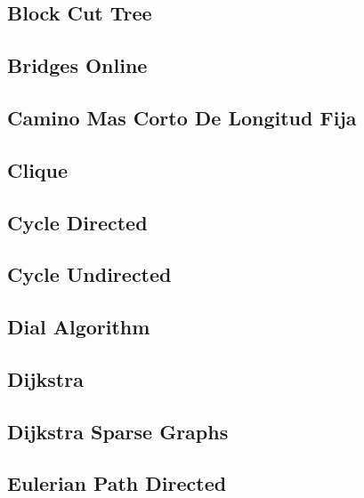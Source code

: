 \subsection{Block Cut Tree}
\raggedbottom
\hrulefill
\subsection{Bridges Online}
\raggedbottom
\hrulefill
\subsection{Camino Mas Corto De Longitud Fija}
\raggedbottom
\hrulefill
\subsection{Clique}
\raggedbottom
\hrulefill
\subsection{Cycle Directed}
\raggedbottom
\hrulefill
\subsection{Cycle Undirected}
\raggedbottom
\hrulefill
\subsection{Dial Algorithm}
\raggedbottom
\hrulefill
\subsection{Dijkstra}
\raggedbottom
\hrulefill
\subsection{Dijkstra Sparse Graphs}
\raggedbottom
\hrulefill
\subsection{Eulerian Path Directed}
\raggedbottom
\hrulefill
